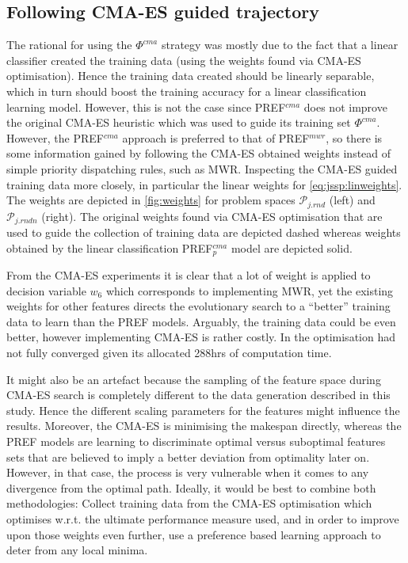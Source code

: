 \documentclass[smallextended]{llncs}
\newcommand{\PREF}[2]{PREF$_{#2}^{#1}$}
\begin{document}
\subsection{Following CMA-ES guided trajectory}\label{sec:expr:cmaes}
The rational for using the $\Phi^{cma}$ strategy was mostly due to the fact that a linear classifier created the training data (using the weights found via CMA-ES optimisation). Hence the training data created should be linearly separable, which in turn should boost the training accuracy for a linear classification learning model. However, this is not the case since \PREF{cma}{} does not improve the original CMA-ES heuristic which was used to guide its training set $\Phi^{cma}$. 
However, the \PREF{cma}{} approach is preferred to that of \PREF{mwr}{}, so there is some information gained by following the CMA-ES obtained weights instead of simple priority dispatching rules, such as MWR. 
%
Inspecting the CMA-ES guided training data more closely, in particular the linear weights for \cref{eq:jssp:linweights}. The weights are depicted in \cref{fig:weights} for problem spaces $\mathcal{P}_{j.rnd}$ (left) and $\mathcal{P}_{j.rndn}$ (right). The original weights found via CMA-ES optimisation that are used to guide the collection of training data are depicted dashed whereas weights obtained by the linear classification \PREF{cma}{p} model are depicted solid. 

From the CMA-ES experiments it is clear that a lot of weight is applied to decision variable $w_6$ which corresponds to implementing MWR, yet the existing weights for other features directs the evolutionary search to a ``better'' training data to learn than the PREF models. Arguably, the training data could be even better, however implementing CMA-ES is rather costly. In \cite{InRu14a} the optimisation had not fully converged given its allocated 288hrs of computation time.

It might also be an artefact because the sampling of the feature space during CMA-ES search is completely different to the data generation described in this study. Hence the different scaling parameters for the features might influence the results. Moreover, the CMA-ES is minimising the makespan directly, whereas the PREF models are learning to discriminate optimal versus suboptimal features sets that  are believed to imply a better deviation from optimality later on. However, in that case, the process is very vulnerable when it comes to any divergence from the optimal path. 
Ideally,  it would be best to combine both methodologies: Collect training data from the CMA-ES optimisation which optimises w.r.t. the ultimate performance measure used, and in order to improve upon those weights even further, use a preference based learning approach to deter from any local minima. 
\end{document}

